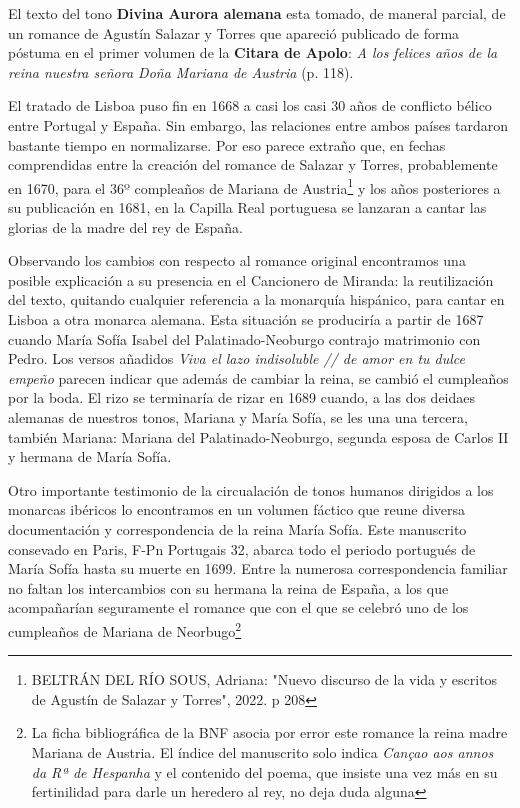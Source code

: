El texto del tono \textbf{Divina Aurora alemana} esta tomado, de maneral parcial, de un romance de Agustín Salazar y Torres que apareció publicado de forma póstuma en el primer volumen de la \textbf{Citara de Apolo}: \textit{A los felices años de la reina nuestra señora Doña Mariana de Austria} (p. 118). 


El tratado de Lisboa puso fin en 1668 a casi los casi 30 años de conflicto bélico entre Portugal y España. Sin embargo, las relaciones entre ambos países tardaron bastante tiempo en normalizarse. Por eso parece extraño que, en fechas comprendidas entre la creación del romance de Salazar y Torres, probablemente en 1670, para el 36º compleaños de Mariana de Austria\footnote{BELTRÁN DEL RÍO SOUS, Adriana: "Nuevo discurso de la vida y escritos de Agustín de Salazar y Torres", 2022. p 208} y los años posteriores a su publicación en 1681, en la Capilla Real portuguesa se lanzaran a cantar las glorias de la madre del rey de España.

Observando los cambios con respecto al romance original encontramos una posible explicación a su presencia en el Cancionero de Miranda: la reutilización del texto, quitando cualquier referencia a la monarquía hispánico, para cantar en Lisboa a otra monarca alemana. Esta situación se produciría a partir de 1687 cuando María Sofía Isabel del Palatinado-Neoburgo contrajo matrimonio con Pedro. Los versos añadidos \textit{Viva el lazo indisoluble // de amor en tu dulce empeño} parecen indicar que además de cambiar la reina, se cambió el cumpleaños por la boda. El rizo se terminaría de rizar en 1689 cuando, a las dos deidaes alemanas de nuestros tonos, Mariana y María Sofía, se les una una tercera, también Mariana: Mariana del Palatinado-Neoburgo, segunda esposa de Carlos II y hermana de María Sofía. 

Otro importante testimonio de la circualación de tonos humanos dirigidos a los monarcas ibéricos lo encontramos en un volumen fáctico que reune diversa documentación y correspondencia de la reina María Sofía. Este manuscrito consevado en Paris, F-Pn Portugais 32, abarca todo el periodo portugués de María Sofía hasta su muerte en 1699. Entre la numerosa correspondencia familiar no faltan los intercambios con su hermana la reina de España, a los que acompañarían seguramente el romance que con el que se celebró uno de los cumpleaños de Mariana de Neorbugo\footnote{La ficha bibliográfica de la BNF asocia por error este romance la reina madre Mariana de Austria. El índice del manuscrito solo indica \textit{Cançao aos annos da Rª de Hespanha} y el contenido del poema, que insiste una vez más en su fertinilidad para darle un heredero al rey, no deja duda alguna}



